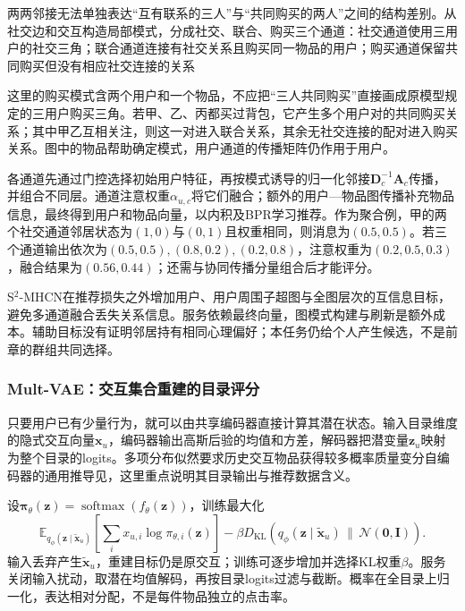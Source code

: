 两两邻接无法单独表达“互有联系的三人”与“共同购买的两人”之间的结构差别。从社交边和交互构造局部模式，分成社交、联合、购买三个通道：社交通道使用三用户的社交三角；联合通道连接有社交关系且购买同一物品的用户；购买通道保留共同购买但没有相应社交连接的关系

这里的购买模式含两个用户和一个物品，不应把“三人共同购买”直接画成原模型规定的三用户购买三角。若甲、乙、丙都买过背包，它产生多个用户对的共同购买关系；其中甲乙互相关注，则这一对进入联合关系，其余无社交连接的配对进入购买关系。图中的物品帮助确定模式，用户通道的传播矩阵仍作用于用户。

各通道先通过门控选择初始用户特征，再按模式诱导的归一化邻接$\bm D_c^{-1}\bm A_c$传播，并组合不同层。通道注意权重$\alpha_{u,c}$将它们融合；额外的用户—物品图传播补充物品信息，最终得到用户和物品向量，以内积及BPR学习推荐。作为聚合例，甲的两个社交通道邻居状态为$(1,0)$与$(0,1)$且权重相同，则消息为$(0.5,0.5)$。若三个通道输出依次为$(0.5,0.5),(0.8,0.2),(0.2,0.8)$，注意权重为$(0.2,0.5,0.3)$，融合结果为$(0.56,0.44)$；还需与协同传播分量组合后才能评分。

S$^2$-MHCN在推荐损失之外增加用户、用户周围子超图与全图层次的互信息目标，避免多通道融合丢失关系信息。服务依赖最终向量，图模式构建与刷新是额外成本。辅助目标没有证明邻居持有相同心理偏好；本任务仍给个人产生候选，不是前章的群组共同选择。

\subsubsection{Mult-VAE：交互集合重建的目录评分}
\label{sec:rs-mult-vae}

只要用户已有少量行为，就可以由共享编码器直接计算其潜在状态。输入目录维度的隐式交互向量$\bm x_u$，编码器输出高斯后验的均值和方差，解码器把潜变量$\bm z_u$映射为整个目录的logits。多项分布似然要求历史交互物品获得较多概率质量变分自编码器的通用推导见，这里重点说明其目录输出与推荐数据含义。

设$\bm\pi_\theta(\bm z)=\operatorname{softmax}(f_\theta(\bm z))$，训练最大化
\begin{equation}
 \mathbb E_{q_\phi(\bm z\mid\widetilde{\bm x}_u)}
       \left[\sum_i x_{u,i}\log\pi_{\theta,i}(\bm z)\right]
 -\beta D_{\mathrm{KL}}\!\left(q_\phi(\bm z\mid\widetilde{\bm x}_u)
                              \,\|\,\mathcal N(\bm0,\bm I)\right).
 \label{eq:rs-mult-vae}
\end{equation}
输入丢弃产生$\widetilde{\bm x}_u$，重建目标仍是原交互；训练可逐步增加并选择KL权重$\beta$。服务关闭输入扰动，取潜在均值解码，再按目录logits过滤与截断。概率在全目录上归一化，表达相对分配，不是每件物品独立的点击率。

